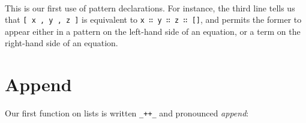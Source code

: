 \begin{fence}
\begin{code}
\AgdaSpace{}%
\AgdaSpace{}%
\AgdaSpace{}%
\AgdaSpace{}%
\AgdaSpace{}%
\AgdaSpace{}%
\AgdaSpace{}%
\AgdaSpace{}%
\AgdaInductiveConstructor{[]}\<%
\\
\>[0]\AgdaSpace{}%
\AgdaOperator{\AgdaInductiveConstructor{[\AgdaUnderscore{},\AgdaUnderscore{},\AgdaUnderscore{},\AgdaUnderscore{},\AgdaUnderscore{},\AgdaUnderscore{}]}}\AgdaSpace{}%
\AgdaSpace{}%
\AgdaSpace{}%
\AgdaSpace{}%
\AgdaSpace{}%
\AgdaSpace{}%
\AgdaSpace{}%
\AgdaSymbol{=}\AgdaSpace{}%
\AgdaSpace{}%
\AgdaSpace{}%
\AgdaSpace{}%
\AgdaSpace{}%
\AgdaSpace{}%
\AgdaSpace{}%
\AgdaSpace{}%
\AgdaSpace{}%
\AgdaSpace{}%
\AgdaSpace{}%
\AgdaSpace{}%
\AgdaSpace{}%
\AgdaInductiveConstructor{[]}\<%
\end{code}
\end{fence}

This is our first use of pattern declarations. For instance, the third
line tells us that \texttt{{[}\ x\ ,\ y\ ,\ z\ {]}} is equivalent to
\texttt{x\ ∷\ y\ ∷\ z\ ∷\ {[}{]}}, and permits the former to appear
either in a pattern on the left-hand side of an equation, or a term on
the right-hand side of an equation.

\hypertarget{append}{%
\section{Append}\label{append}}

Our first function on lists is written \texttt{\_++\_} and pronounced
\emph{append}:

